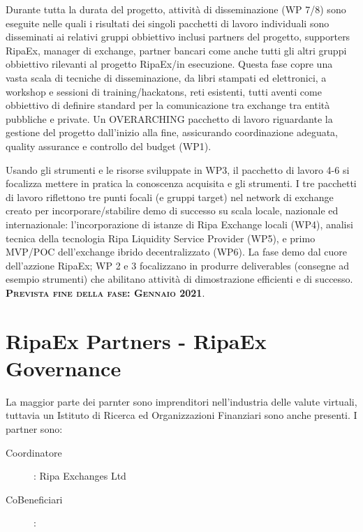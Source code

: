 \documentclass[11pt,fleqn,oneside]{book} %
\begin{document}
\begin{center}
\begin{tcolorbox}[roadmapBox,
	title=\textbf{\textsc{Esecuzione/Disseminazione (WP 7/8) e Coordinamento del Progetto (WP1)}}]

	Durante tutta la durata del progetto,
	attività di disseminazione (WP 7/8) sono eseguite nelle quali i risultati dei singoli
	pacchetti di lavoro individuali sono disseminati ai relativi gruppi obbiettivo inclusi
	partners del progetto, supporters RipaEx, manager di exchange, partner bancari come anche
	tutti gli altri gruppi obbiettivo rilevanti al progetto RipaEx/in esecuzione.
	Questa fase copre una vasta scala di tecniche di disseminazione, da libri stampati ed 
	elettronici, a workshop e sessioni di training/hackatons, reti esistenti, tutti aventi 
	come obbiettivo di definire standard per la comunicazione tra exchange tra entità pubbliche e private.
	Un OVERARCHING pacchetto di lavoro riguardante la gestione del progetto dall'inizio alla fine, 
	assicurando coordinazione adeguata, quality assurance e controllo del budget (WP1).
\end{tcolorbox}

\resizebox{0.05\textwidth}{26pt}{$\Downarrow$}

\begin{tcolorbox}[roadmapBox,
	title=\textbf{\textsc{Sviluppo di un exchange ibrido-decentralizzato (WP 4-6)}}]

	Usando gli strumenti e le risorse sviluppate in WP3, il pacchetto di lavoro 4-6
	si focalizza mettere in pratica la conoscenza acquisita e gli strumenti. I tre
	pacchetti di lavoro riflettono tre punti focali (e gruppi target) nel network di 
	exchange creato per incorporare/stabilire demo di successo su scala locale, nazionale ed internazionale:
	l'incorporazione di istanze di Ripa Exchange locali (WP4), analisi tecnica della tecnologia
	Ripa Liquidity Service Provider (WP5), e primo MVP/POC dell'exchange ibrido decentralizzato (WP6).
	La fase demo dal cuore dell'azzione RipaEx; WP 2 e 3 focalizzano in produrre deliverables (consegne ad esempio
	strumenti) che abilitano attività di dimostrazione efficienti e di successo.
	\vspace{1cm}
	\centering\textbf{\textsc{Prevista fine della fase: Gennaio 2021}}.
\end{tcolorbox}
\end{center}

\section{RipaEx Partners - RipaEx Governance}
La maggior parte dei parnter sono imprenditori nell'industria delle valute virtuali, tuttavia
un Istituto di Ricerca ed Organizzazioni Finanziari sono anche presenti. I partner sono:
\begin{description}
	\item[Coordinatore]: Ripa Exchanges Ltd
	\item[CoBeneficiari]: 
\end{description}
\end{document}
